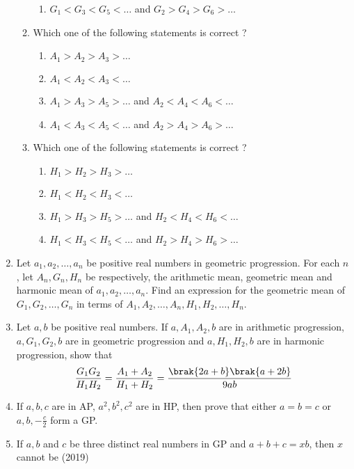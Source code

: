 \begin{enumerate}[label=\thesubsection.\arabic*,ref=\thesubsection.\theenumi]
\begin{enumerate}
\begin{enumerate}
%
\item$G_{1}<G_{3}<G_{5}<\dots$ and $G_{2}>G_{4}>G_{6}>\dots$
\end{enumerate}
%
\item Which one of the following statements is correct ?
\begin{enumerate}    
%    
\item $A_{1}>A_{2}>A_{3}>\dots$ 
%
\item $A_{1}<A_{2}<A_{3}<\dots$
%
\item $A_{1}>A_{3}>A_{5}>\dots$ and $A_{2}<A_{4}<A_{6}<\dots$
%
\item $A_{1}<A_{3}<A_{5}<\dots$ and $A_{2}>A_{4}>A_{6}>\dots$
\end{enumerate}
%
\item Which one of the following statements is correct ?
\begin{enumerate}    
%
	\item $H_{1}>H_{2}>H_{3}>\dots$ 
%
 \item $H_{1}<H_{2}<H_{3}<\dots$
%
\item $H_{1}>H_{3}>H_{5}>\dots$ and $H_{2}<H_{4}<H_{6}<\dots$
%
\item $H_{1}<H_{3}<H_{5}<\dots$ and $H_{2}>H_{4}>H_{6}>\dots$
\end{enumerate}
\end{enumerate}
%
      \item Let $ a_{1}, a_{2}, \dots, a_{n} $ be positive real numbers in geometric progression. For each $n$, let $ A_{n}, G_{n}, H_{n} $ be respectively,  the arithmetic mean,  geometric mean and harmonic mean of $ a_{1}, a_{2}, \dots, a_{n}.$ Find an expression for the geometric mean of $ G_{1}, G_{2}, \dots, G_{n} $ in terms of $ A_{1}, A_{2}, \dots, A_{n}, H_{1}, H_{2}, \dots, H_{n}.$ 
%      
	      \hfill {}                              
%       
       \item Let $a, b$ be positive real numbers. If $ a, A_{1}, A_{2}, b $ are in arithmetic progression,  $ a, G_{1}, G_{2}, b $ are in geometric progression and $ a, H_{1}, H_{2}, b $ are in harmonic progression,  show that 
	       $$ \frac{G_{1}G_{2}}{H_{1}H_{2}}=\frac{A_{1}+A_{2}}{H_{1}+H_{2}}=\frac{\brak{2a+b}\brak{a+2b}}{9ab} $$ 
%
		\hfill {}                             
	\item If $a, b, c$ are in AP, $a^{2}, b^{2}, c^{2} $ are in HP,  then prove that either $ a=b=c $ or $a, b, -\frac{c}{2}$ form a GP.
%		                    
		\hfill {}                            
  \item{If $a,  b$ and $c$ be three distinct real numbers in GP and $a+b+c=xb$,  then $x$ cannot be \hfill{(2019)}
}
\end{enumerate}

